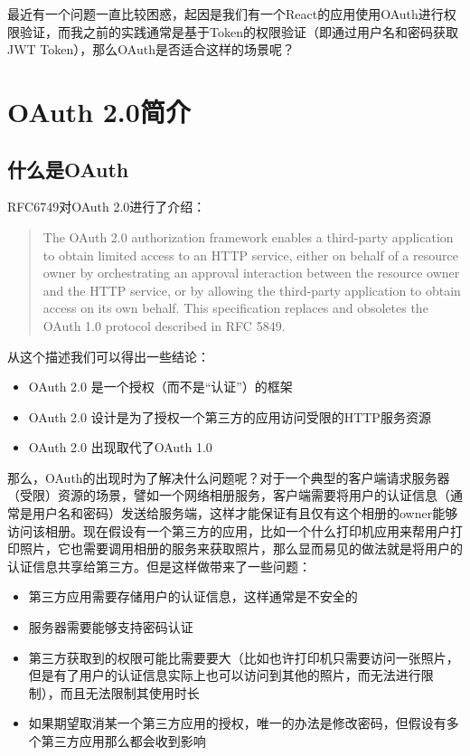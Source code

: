 \documentclass[12pt]{article}
\begin{document}
\makeblogtitle

最近有一个问题一直比较困惑，起因是我们有一个React的应用使用OAuth进行权限验证，而我之前的实践通常是基于Token的权限验证（即通过用户名和密码获取JWT Token），那么OAuth是否适合这样的场景呢？

\section{OAuth 2.0简介}\label{oauth-2.0ux7b80ux4ecb}

\subsection{什么是OAuth}\label{ux4ec0ux4e48ux662foauth}

RFC6749对OAuth 2.0进行了介绍：

\begin{quote}
The OAuth 2.0 authorization framework enables a third-party application to obtain limited access to an HTTP service, either on behalf of a resource owner by orchestrating an approval interaction between the resource owner and the HTTP service, or by allowing the third-party application to obtain access on its own behalf. This specification replaces and obsoletes the OAuth 1.0 protocol described in RFC 5849.
\end{quote}

从这个描述我们可以得出一些结论：

\begin{itemize}
\tightlist
\item
  OAuth 2.0 是一个授权（而不是``认证''）的框架
\item
  OAuth 2.0 设计是为了授权一个第三方的应用访问受限的HTTP服务资源
\item
  OAuth 2.0 出现取代了OAuth 1.0
\end{itemize}

那么，OAuth的出现时为了解决什么问题呢？对于一个典型的客户端请求服务器（受限）资源的场景，譬如一个网络相册服务，客户端需要将用户的认证信息（通常是用户名和密码）发送给服务端，这样才能保证有且仅有这个相册的owner能够访问该相册。现在假设有一个第三方的应用，比如一个什么打印机应用来帮用户打印照片，它也需要调用相册的服务来获取照片，那么显而易见的做法就是将用户的认证信息共享给第三方。但是这样做带来了一些问题：

\begin{itemize}
\tightlist
\item
  第三方应用需要存储用户的认证信息，这样通常是不安全的
\item
  服务器需要能够支持密码认证
\item
  第三方获取到的权限可能比需要要大（比如也许打印机只需要访问一张照片，但是有了用户的认证信息实际上也可以访问到其他的照片，而无法进行限制），而且无法限制其使用时长
\item
  如果期望取消某一个第三方应用的授权，唯一的办法是修改密码，但假设有多个第三方应用那么都会收到影响
\end{itemize}
\end{document}
